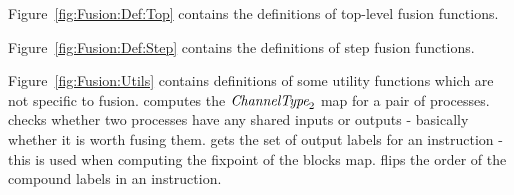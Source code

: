 Figure~\ref{fig:Fusion:Def:Top} contains the definitions of top-level fusion functions.

Figure~\ref{fig:Fusion:Def:Step} contains the definitions of step fusion functions.



Figure~\ref{fig:Fusion:Utils} contains definitions of some utility functions which are not specific to fusion.
 computes the $\textit{ChannelType}_2$ map for a pair of processes.
 checks whether two processes have any shared inputs or outputs - basically whether it is worth fusing them.
 gets the set of output labels for an instruction - this is used when computing the fixpoint of the blocks map.
 flips the order of the compound labels in an instruction.
